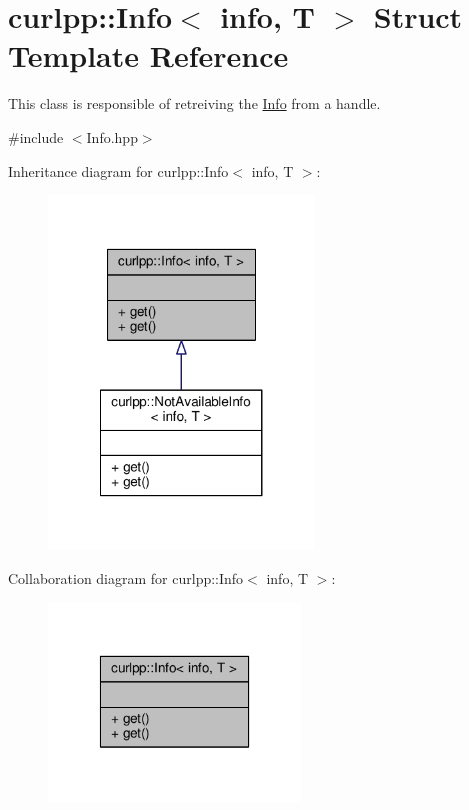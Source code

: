 \hypertarget{structcurlpp_1_1Info}{\section{curlpp\-:\-:Info$<$ info, T $>$ Struct Template Reference}
\label{structcurlpp_1_1Info}
}


This class is responsible of retreiving the \hyperlink{structcurlpp_1_1Info}{Info} from a handle.  




{\ttfamily \#include $<$Info.\-hpp$>$}



Inheritance diagram for curlpp\-:\-:Info$<$ info, T $>$\-:\nopagebreak
\begin{figure}[H]
\begin{center}
\leavevmode
\includegraphics[width=200pt]{structcurlpp_1_1Info__inherit__graph}
\end{center}
\end{figure}


Collaboration diagram for curlpp\-:\-:Info$<$ info, T $>$\-:\nopagebreak
\begin{figure}[H]
\begin{center}
\leavevmode
\includegraphics[width=190pt]{structcurlpp_1_1Info__coll__graph}
\end{center}
\end{figure}

